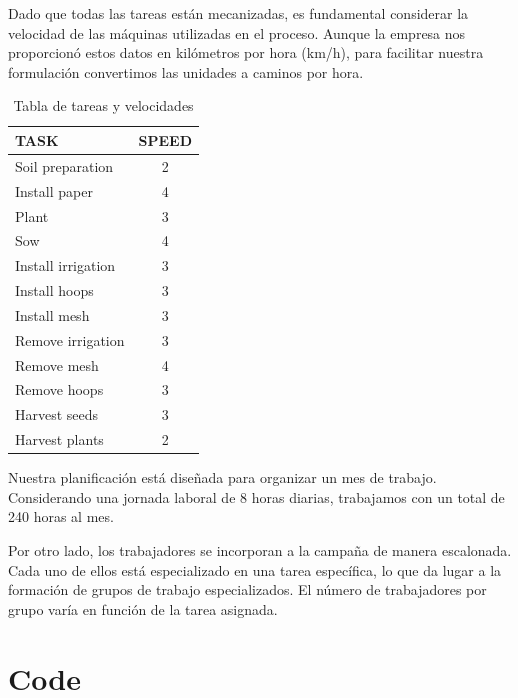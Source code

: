 Dado que todas las tareas están mecanizadas, es fundamental considerar la velocidad de las máquinas utilizadas en el
 proceso. Aunque la empresa nos proporcionó estos datos en kilómetros por hora (km/h), para facilitar nuestra formulación 
 convertimos las unidades a caminos por hora.
 
 \begin{table}[ht!]
    \centering
    \begin{tabular}{|l|c|}
        \hline
        \rowcolor{gray!30} \textbf{\textcolor{grey3}{TASK}} & \textbf{\textcolor{grey3}{SPEED}} \\ 
        \hline
        Soil preparation   & 2  \\ \hline
        Install paper      & 4  \\ \hline
        Plant              & 3  \\ \hline
        Sow                & 4  \\ \hline
        Install irrigation & 3  \\ \hline
        Install hoops      & 3  \\ \hline
        Install mesh       & 3  \\ \hline
        Remove irrigation  & 3  \\ \hline
        Remove mesh        & 4  \\ \hline
        Remove hoops       & 3  \\ \hline
        Harvest seeds      & 3  \\ \hline
        Harvest plants     & 2  \\ 
        \hline
    \end{tabular}
    \caption{Tabla de tareas y velocidades}
    \label{tab:tareas}
\end{table}

Nuestra planificación está diseñada para organizar un mes de trabajo. Considerando una jornada laboral de 8 horas diarias, 
trabajamos con un total de 240 horas al mes.

Por otro lado, los trabajadores se incorporan a la campaña de manera escalonada. Cada uno de ellos está especializado en una 
tarea específica, lo que da lugar a la formación de grupos de trabajo especializados. El número de trabajadores por grupo varía 
en función de la tarea asignada.



\chapter*{Code}

